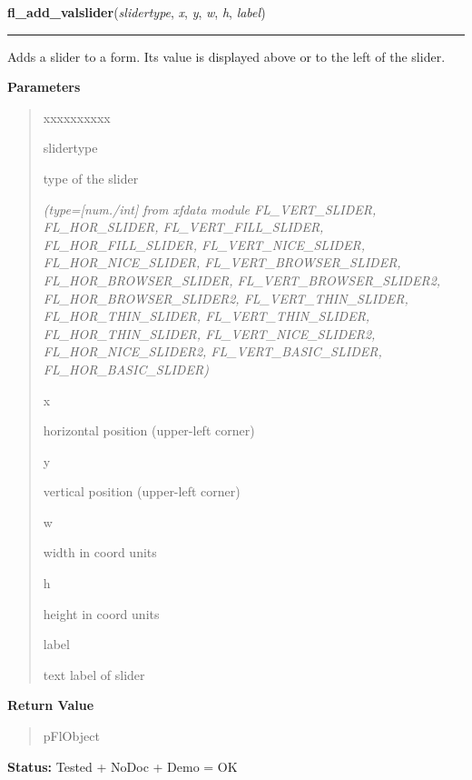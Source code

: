 \hspace{.8\funcindent}\begin{boxedminipage}{\funcwidth}

    \raggedright \textbf{fl\_add\_valslider}(\textit{slidertype}, \textit{x}, \textit{y}, \textit{w}, \textit{h}, \textit{label})

    \vspace{-1.5ex}

    \rule{\textwidth}{0.5\fboxrule}
\setlength{\parskip}{2ex}
    Adds a slider to a form. Its value is displayed above or to the left of
    the slider.

\setlength{\parskip}{1ex}
      \textbf{Parameters}
      \vspace{-1ex}

      \begin{quote}
        \begin{Ventry}{xxxxxxxxxx}

          \item[slidertype]

          type of the slider

            {\it (type=[num./int] from xfdata module FL\_VERT\_SLIDER, FL\_HOR\_SLIDER, 
FL\_VERT\_FILL\_SLIDER, FL\_HOR\_FILL\_SLIDER, FL\_VERT\_NICE\_SLIDER, 
FL\_HOR\_NICE\_SLIDER, FL\_VERT\_BROWSER\_SLIDER, FL\_HOR\_BROWSER\_SLIDER,
FL\_VERT\_BROWSER\_SLIDER2, FL\_HOR\_BROWSER\_SLIDER2, 
FL\_VERT\_THIN\_SLIDER, FL\_HOR\_THIN\_SLIDER, FL\_VERT\_THIN\_SLIDER, 
FL\_HOR\_THIN\_SLIDER, FL\_VERT\_NICE\_SLIDER2, FL\_HOR\_NICE\_SLIDER2, 
FL\_VERT\_BASIC\_SLIDER, FL\_HOR\_BASIC\_SLIDER)}

          \item[x]

          horizontal position (upper-left corner)

          \item[y]

          vertical position (upper-left corner)

          \item[w]

          width in coord units

          \item[h]

          height in coord units

          \item[label]

          text label of slider

        \end{Ventry}

      \end{quote}

      \textbf{Return Value}
    \vspace{-1ex}

      \begin{quote}
      pFlObject

      \end{quote}

\textbf{Status:} Tested + NoDoc + Demo = OK



    \end{boxedminipage}

